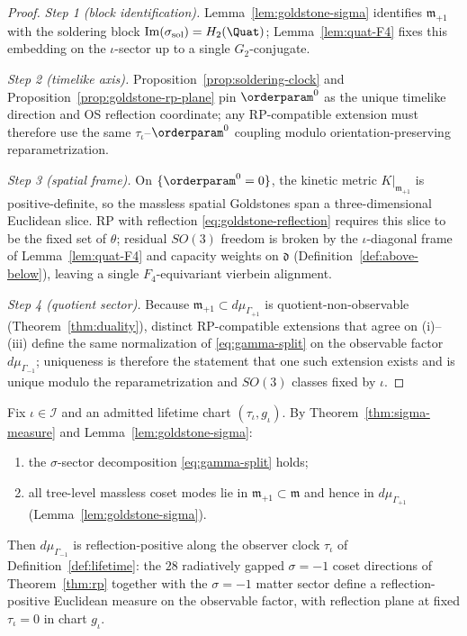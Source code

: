 \begin{proof}
\emph{Step 1 (block identification).} Lemma~\ref{lem:goldstone-sigma}
identifies $\mathfrak{m}_{+1}$ with the soldering block
$\mathrm{Im}(\sigma_{\mathrm{sol}})=H_2(\Quat)$; Lemma~\ref{lem:quat-F4}
fixes this embedding on the $\iota$-sector up to a single $G_2$-conjugate.

\emph{Step 2 (timelike axis).} Proposition~\ref{prop:soldering-clock} and
Proposition~\ref{prop:goldstone-rp-plane} pin $\orderparam^0$ as the unique
timelike direction and OS reflection coordinate; any RP-compatible extension
must therefore use the same $\tau_\iota$--$\orderparam^0$ coupling modulo
orientation-preserving reparametrization.

\emph{Step 3 (spatial frame).} On $\{\orderparam^0=0\}$, the kinetic metric
$K|_{\mathfrak{m}_{+1}}$ is positive-definite, so the massless spatial
Goldstones span a three-dimensional Euclidean slice. RP with reflection
\eqref{eq:goldstone-reflection} requires this slice to be the fixed set of
$\theta$; residual $SO(3)$ freedom is broken by the $\iota$-diagonal frame
of Lemma~\ref{lem:quat-F4} and capacity weights on $\mathfrak{d}$
(Definition~\ref{def:above-below}), leaving a single $F_4$-equivariant
vierbein alignment.

\emph{Step 4 (quotient sector).} Because $\mathfrak{m}_{+1}\subset
d\mu_{\Gamma_{+1}}$ is quotient-non-observable
(Theorem~\ref{thm:duality}), distinct RP-compatible extensions that agree on
(i)--(iii) define the same normalization of \eqref{eq:gamma-split} on the
observable factor $d\mu_{\Gamma_{-1}}$; uniqueness is therefore the statement
that one such extension exists and is unique modulo the reparametrization and
$SO(3)$ classes fixed by $\iota$.
\end{proof}

\begin{theorem}
\label{thm:rp-gamma-neg}
Fix $\iota\in\mathcal{I}$ and an admitted lifetime chart
$(\tau_\iota,g_\iota)$. By Theorem~\ref{thm:sigma-measure} and
Lemma~\ref{lem:goldstone-sigma}:
\begin{enumerate}[label=(\roman*),leftmargin=*]
  \item the $\sigma$-sector decomposition \eqref{eq:gamma-split} holds;
  \item all tree-level massless coset modes lie in
    $\mathfrak{m}_{+1}\subset\mathfrak{m}$ and hence in $d\mu_{\Gamma_{+1}}$
    (Lemma~\ref{lem:goldstone-sigma}).
\end{enumerate}
Then $d\mu_{\Gamma_{-1}}$ is reflection-positive along the observer clock
$\tau_\iota$ of Definition~\ref{def:lifetime}: the $28$ radiatively gapped
$\sigma=-1$ coset directions of Theorem~\ref{thm:rp} together with the
$\sigma=-1$ matter sector define a reflection-positive Euclidean measure on
the observable factor, with reflection plane at fixed $\tau_\iota=0$ in chart
$g_\iota$.
\end{theorem}

